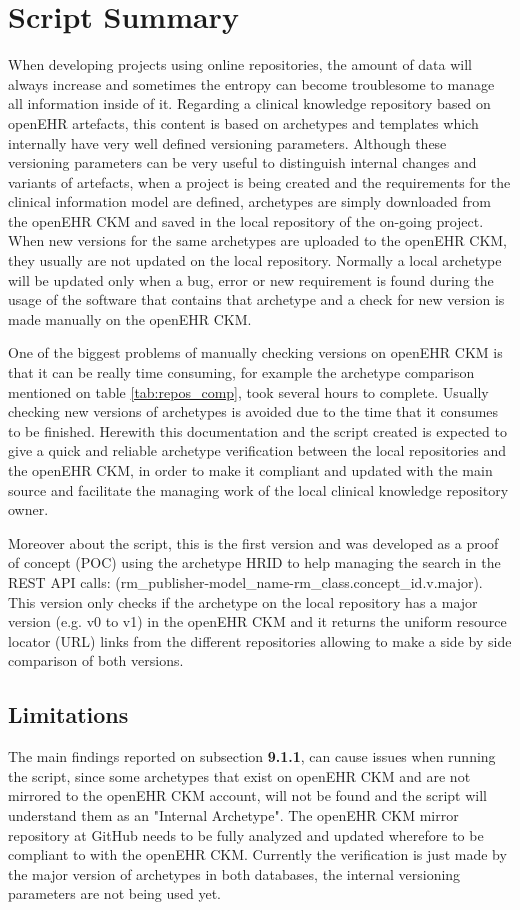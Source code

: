 \documentclass[mim_thesis.tex]{subfiles}
\begin{document}
\section{Script Summary}
When developing projects using online repositories, the amount of data will always increase and sometimes the entropy can become troublesome to manage all information inside of it. Regarding a clinical knowledge repository based on openEHR artefacts, this content is based on archetypes and templates which internally have very well defined versioning parameters. Although these versioning parameters can be very useful to distinguish internal changes and variants of artefacts, when a project is being created and the requirements for the clinical information model are defined, archetypes are simply downloaded from the openEHR CKM and saved in the local repository of the on-going project. When new versions for the same archetypes are uploaded to the openEHR CKM, they usually are not updated on the local repository. Normally a local archetype will be updated only when a bug, error or new requirement is found during the usage of the software that contains that archetype and a check for new version is made manually on the openEHR CKM. 

One of the biggest problems of manually checking versions on openEHR CKM is that it can be really time consuming, for example the archetype comparison mentioned on table \ref{tab:repos_comp}, took several hours to complete. Usually checking new versions of archetypes is avoided due to the time that it consumes to be finished. Herewith this documentation and the script created is expected to give a quick and reliable archetype verification between the local repositories and the openEHR CKM, in order to make it compliant and updated with the main source and facilitate the managing work of the local clinical knowledge repository owner. 

Moreover about the script, this is the first version and was developed as a proof of concept (POC) using the archetype HRID to help managing the search in the REST API calls: (rm\_publisher-model\_name-rm\_class.concept\_id.v.major). This version only checks if the archetype on the local repository has a major version (e.g. v0 to v1) in the openEHR CKM and it returns the uniform resource locator (URL) links from the different repositories allowing to make a side by side comparison of both versions. 

\subsection{Limitations}
The main findings reported on subsection \textbf{9.1.1}, can cause issues when running the script, since some archetypes that exist on openEHR CKM and are not mirrored to the openEHR CKM account, will not be found and the script will understand them as an "Internal Archetype". The openEHR CKM mirror repository at GitHub needs to be fully analyzed and updated wherefore to be compliant to with the openEHR CKM. Currently the verification is just made by the major version of archetypes in both databases, the internal versioning parameters are not being used yet. \\
\end{document}

